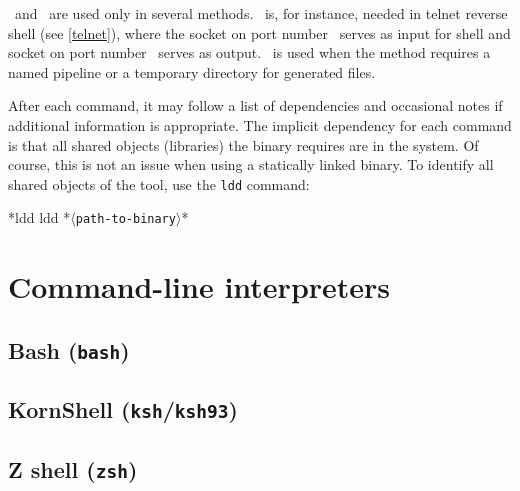 \portt\ and \tmp\ are used only in several methods. \portt\ is, for instance, needed in telnet reverse shell (see \ref{telnet}), where the socket on port number \port\ serves as input for shell and socket on port number \portt\ serves as output. \tmp\ is used when the method requires a named pipeline or a temporary directory for generated files.

After each command, it may follow a list of dependencies and occasional notes if additional information is appropriate. The implicit dependency for each command is that all shared objects (libraries) the binary requires are in the system. Of course, this is not an issue when using a statically linked binary. To identify all shared objects of the tool, use the \texttt{ldd} command:
\begin{cmdline}{*}{ldd}{}
ldd *\textcolor{placeholder}{\texttt{$\langle$path-to-binary$\rangle$}}*
\end{cmdline}

\section{Command-line interpreters}

\subsection{Bash (\texttt{bash})}






\subsection{KornShell (\texttt{ksh}/\texttt{ksh93})}





\subsection{Z shell (\texttt{zsh})}

